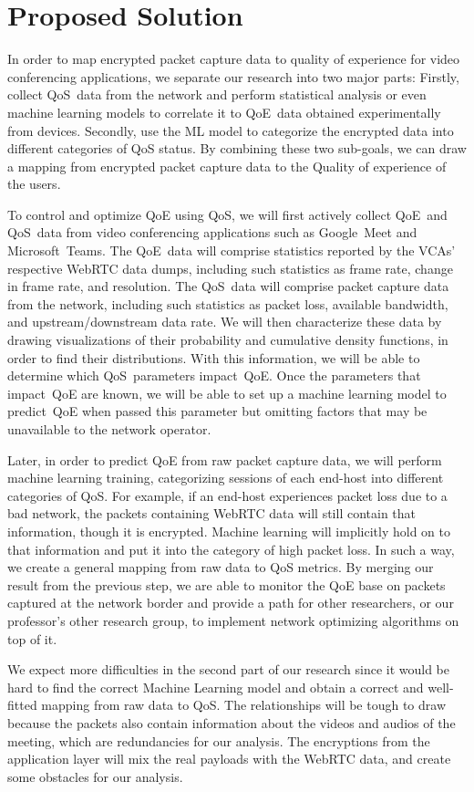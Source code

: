 \section{Proposed Solution}\label{proposed-solution}
    In order to map encrypted packet capture data to quality of experience for video conferencing applications, we separate our research into two major parts: Firstly, collect QoS~data from the network and perform statistical analysis or even machine learning models to correlate it to QoE~data obtained experimentally from devices. Secondly, use the ML model to categorize the encrypted data into different categories of QoS status. By combining these two sub-goals, we can draw a mapping from encrypted packet capture data to the Quality of experience of the users.

    To control and optimize QoE using QoS, we will first actively collect QoE~and QoS~data from video conferencing applications such as Google~Meet and Microsoft~Teams. The QoE~data will comprise statistics reported by the VCAs' respective WebRTC data dumps, including such statistics as frame rate, change in frame rate, and resolution. The QoS~data will comprise packet capture data from the network, including such statistics as packet loss, available bandwidth, and upstream/downstream data rate. We will then characterize these data by drawing visualizations of their probability and cumulative density functions, in order to find their distributions. With this information, we will be able to determine which QoS~parameters impact~QoE. Once the parameters that impact~QoE are known, we will be able to set up a machine learning model to predict~QoE when passed this parameter but omitting factors that may be unavailable to the network operator.

    Later, in order to predict QoE from raw packet capture data, we will perform machine learning training, categorizing sessions of each end-host into different categories of QoS. For example, if an end-host experiences packet loss due to a bad network, the packets containing WebRTC data will still contain that information, though it is encrypted. Machine learning will implicitly hold on to that information and put it into the category of high packet loss. In such a way, we create a general mapping from raw data to QoS metrics. By merging our result from the previous step, we are able to monitor the QoE base on packets captured at the network border and provide a path for other researchers, or our professor's other research group, to implement network optimizing algorithms on top of it. 

    We expect more difficulties in the second part of our research since it would be hard to find the correct Machine Learning model and obtain a correct and well-fitted mapping from raw data to QoS. The relationships will be tough to draw because the packets also contain information about the videos and audios of the meeting, which are redundancies for our analysis. The encryptions from the application layer will mix the real payloads with the WebRTC data, and create some obstacles for our analysis. 